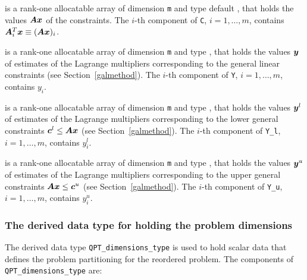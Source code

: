 \documentclass{galahad}
\begin{document}
\begin{description}
 is a rank-one allocatable array of dimension {\tt m} and type default 
\realdp, that holds
the values ${\bm{A}} {\bm{x}}$ of the constraints.
The $i$-th component of {\tt C}, $i = 1,  \ldots ,  m$, contains 
${\bm{A}}_{i}^{T}{\bm{x}} \equiv ({\bm{A}} {\bm{x}})_{i}$.  

 is a rank-one allocatable array of dimension {\tt m} and type 
\realdp, that holds
the values ${\bm{y}}$ of estimates  of the Lagrange multipliers
corresponding to the general linear constraints (see Section~\ref{galmethod}).
The $i$-th component of {\tt Y}, $i = 1,  \ldots ,  m$, contains $y_{i}$.  

 is a rank-one allocatable array of dimension {\tt m} and 
type \realdp, that holds
the values ${\bm{y}}^{l}$ of estimates  of the Lagrange multipliers
corresponding to the lower general constraints ${\bm{c}}^{l} \leq {\bm{A}} {\bm{x}}$
(see Section~\ref{galmethod}).
The $i$-th component of {\tt Y\_l}, $i = 1,  \ldots ,  m$, 
contains $y_{i}^{l}$.  

 is a rank-one allocatable array of dimension {\tt m} and 
type \realdp, that holds
the values ${\bm{y}}^{u}$ of estimates  of the Lagrange multipliers
corresponding to the upper general constraints ${\bm{A}} {\bm{x}} \leq {\bm{c}}^{u}$
(see Section~\ref{galmethod}).
The $i$-th component of {\tt Y\_u}, $i = 1,  \ldots ,  m$, 
contains $y_{i}^{u}$.  

\end{description}



\subsubsection{The derived data type for holding the problem dimensions}
\label{typeprob}
The derived data type 
{\tt QPT\_dimensions\_type} 
is used to hold scalar data that defines the problem partitioning for the
reordered problem. 
The components of 
{\tt QPT\_dimensions\_type} 
are:
\end{document}

